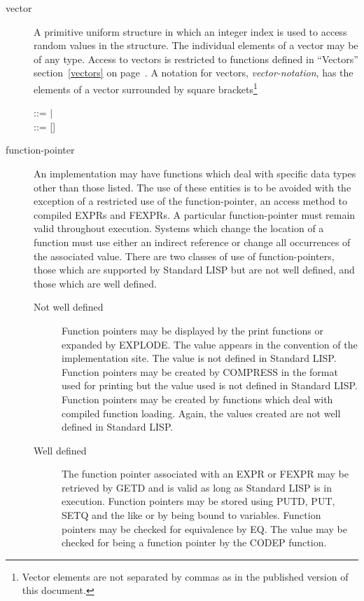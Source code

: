 \begin{description}
\item[vector]  A primitive uniform structure in which
an integer index is used to access random values in the structure. The
individual elements of a vector may be of any type. Access to vectors
is restricted to functions defined in ``Vectors''
section~\ref{vectors} on page~\pageref{vectors}. A notation for
vectors, {\em vector-notation}, has the elements of a vector
surrounded
by square brackets\footnote{Vector elements are not separated by
commas as in the published version of this document.}


\begin{tabbing}
 ::= $\mid$  \\
 ::= []
\end{tabbing}

\item[function-pointer]  An implementation may have
functions which deal with specific data types other than those listed.
The use of these entities is to be avoided with the exception of a
restricted use of the function-pointer, an access method to compiled
EXPRs and FEXPRs. A particular function-pointer must remain valid
 
throughout execution. Systems which change the location of a function
must use either an indirect reference or change all occurrences of the
associated value. There are two classes of use of function-pointers,
those which are supported by Standard LISP but are not well defined,
and those which are well defined.

\begin{description}
\item[Not well defined] Function pointers may be displayed by the print
functions or expanded by EXPLODE.  The value appears in
the convention of the implementation site. The value is not defined in
Standard LISP. Function pointers may be created by COMPRESS
 in the format used for printing but the value used is
not defined in Standard LISP. Function pointers may be created by
functions which deal with compiled function loading. Again, the values
created are not well defined in Standard LISP.

\item[Well defined] The function pointer associated with an EXPR or
FEXPR may be retrieved by GETD  and is valid as long as
Standard LISP is in execution. Function pointers may be stored using
   PUTD, PUT, SETQ and the like or by
being bound to variables.  Function pointers may be checked for
equivalence by EQ.  The value may be
checked for being a function pointer by the CODEP function.
\end{description}
\end{description}


